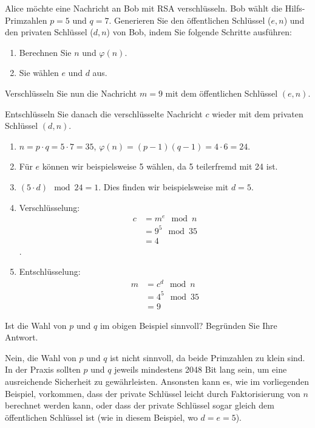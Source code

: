 \begin{myexercise}\label{myexercise:rsa}
	Alice möchte eine Nachricht an Bob mit \gls{RSA} verschlüsseln. Bob wählt die Hilfs-Primzahlen \( p = 5 \) und \( q = 7 \). Generieren Sie den öffentlichen Schlüssel ($e, n$) und den privaten Schlüssel ($d, n$) von Bob, indem Sie folgende Schritte ausführen:
	\begin{enumerate}
		\item Berechnen Sie \( n \) und \( \varphi(n) \).
		\item Sie wählen $e$ und $d$ aus.
	\end{enumerate}

	Verschlüsseln Sie nun die Nachricht \( m = 9 \) mit dem öffentlichen Schlüssel \( (e, n) \).

	Entschlüsseln Sie danach die verschlüsselte Nachricht \( c \) wieder mit dem privaten Schlüssel \( (d, n) \).
	\begin{myanswer}
		\begin{enumerate}
			\item \( n = p \cdot q = 5 \cdot 7 = 35 \), \( \varphi(n) = (p-1)(q-1) = 4 \cdot 6 = 24 \).
			\item Für $e$ können wir beispielsweise 5 wählen, da 5 teilerfremd mit 24 ist.
			\item \( (5 \cdot d) \mod 24 = 1\). Dies finden wir beispielsweise mit \( d = 5 \).
			\item Verschlüsselung:
			      \begin{align*}
				      c & = m^e\mod n   \\
				        & = 9^5 \mod 35 \\
				        & = 4
			      \end{align*}.
			\item Entschlüsselung:
			      \begin{align*}
				      m & = c^d\mod n    \\
				        & =4^{5} \mod 35 \\
				        & = 9
			      \end{align*}
		\end{enumerate}
	\end{myanswer}
\end{myexercise}

\begin{myexercise}
	Ist die Wahl von \( p \) und \( q \) im obigen Beispiel sinnvoll? Begründen Sie Ihre Antwort.
	\begin{myanswer}
		Nein, die Wahl von \( p \) und \( q \) ist nicht sinnvoll, da beide Primzahlen zu klein sind. In der Praxis sollten \( p \) und \( q \) jeweils mindestens 2048 Bit lang sein, um eine ausreichende Sicherheit zu gewährleisten. Ansonsten kann es, wie im vorliegenden Beispiel, vorkommen, dass der private Schlüssel leicht durch Faktorisierung von \( n \) berechnet werden kann, oder dass der private Schlüssel sogar gleich dem öffentlichen Schlüssel ist (wie in diesem Beispiel, wo \( d = e = 5 \)).
	\end{myanswer}
\end{myexercise}

